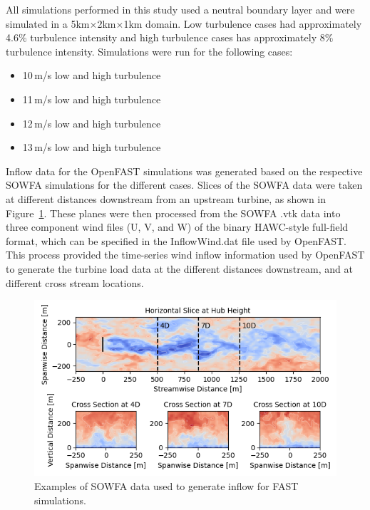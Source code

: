 \documentclass[11pt,letterpaper]{article}
\begin{document}
All simulations performed in this study used a neutral boundary layer and were simulated in a 5km$\times$2km$\times$1km domain.  Low turbulence cases had approximately 4.6$\%$ turbulence intensity and high turbulence cases has approximately 8$\%$ turbulence intensity.  Simulations were run for the following cases:
\begin{itemize}
    \item 10\,m/s low and high turbulence
    \item 11\,m/s low and high turbulence
    \item 12\,m/s low and high turbulence
    \item 13\,m/s low and high turbulence
\end{itemize}

Inflow data for the OpenFAST simulations was generated based on the respective SOWFA simulations for the different cases. Slices of the SOWFA data were taken at different distances downstream from an upstream turbine, as shown in Figure~\ref{fig:sowfa_slices_for_FAST_input}. These planes were then processed from the SOWFA .vtk data into three component wind files (U, V, and W) of the binary HAWC-style full-field format, which can be specified in the InflowWind.dat file used by OpenFAST. This process provided the time-series wind inflow information used by OpenFAST to generate the turbine load data at the different distances downstream, and at different cross stream locations.

\begin{figure}
    \centering
    \includegraphics{images/sowfa_slices.png}
    \caption{Examples of SOWFA data used to generate inflow for FAST simulations.}
    \label{fig:sowfa_slices_for_FAST_input}
\end{figure}
\end{document}

